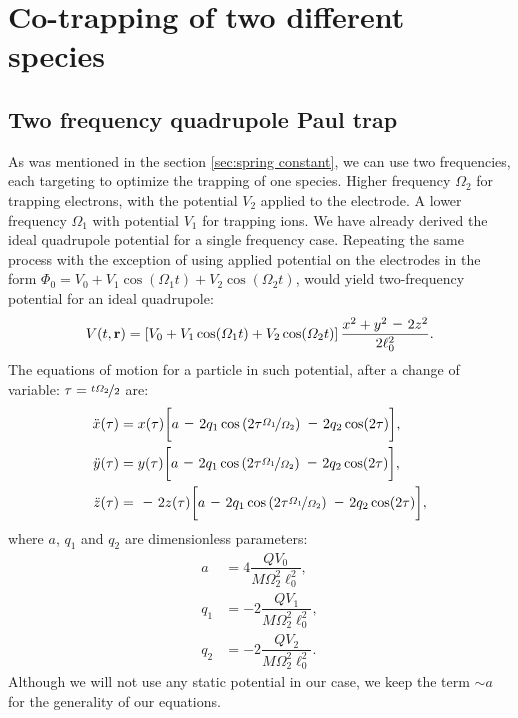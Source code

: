 \chapter{Co-trapping of two different species}
\label{chap:co-trapping}

\section{Two frequency quadrupole Paul trap}
\label{sec:two frequency trap}
As was mentioned in the section \ref{sec:spring constant},
we can use two frequencies, each targeting to optimize the trapping of one species. Higher frequency $\Omega_2$ for trapping electrons, with the potential $V_2$ applied to the electrode. A lower frequency $\Omega_1$ with potential $V_1$ for trapping ions. We have already derived the ideal quadrupole potential for a single frequency case. Repeating the same process with the exception of using applied potential on the electrodes in the form $\Phi_0 = V_0 + V_1 \cos(\Omega_1 t) + V_2 \cos(\Omega_2 t)$, would yield two-frequency potential for an ideal quadrupole:
\begin{equation}
	\label{ideal quadrupole potential two frequency}
	V(t,\vb{r}) = \left[V_0 + V_1 \cos(\Omega_1 t) + V_2 \cos(\Omega_2 t)\right] \dfrac{x^2+y^2 \minus 2z^2}{2\ell_0^2}.
\end{equation}
The equations of motion for a particle in such potential, after a change of variable: $\tau = \nicefrac{t\Omega_2}{2}$ are:
\begin{subequations}
\label{eq of motion for simulation}
\begin{align}
	\ddot{x}(\tau) & = x(\tau) \bigg[ a \minus 2 q_1 \cos\left(2 \tau \nicefrac{\Omega_1}{\Omega_2} \right) \minus 2 q_2 \cos(2\tau) \bigg], \\
	\ddot{y}(\tau) & = y(\tau) \bigg[ a \minus 2 q_1 \cos\left(2 \tau \nicefrac{\Omega_1}{\Omega_2} \right) \minus 2 q_2 \cos(2\tau) \bigg], \\
	\label{studied eq of motion}
	\ddot{z}(\tau) & = \minus 2z(\tau) \bigg[ a \minus 2 q_1 \cos\left(2 \tau \nicefrac{\Omega_1}{\Omega_2} \right) \minus 2 q_2 \cos(2\tau) \bigg],
\end{align}
\end{subequations}
where $a$, $q_1$ and $q_2$ are dimensionless parameters:
\begin{subequations}
\label{Mathieu params}
\begin{align}
	\label{a}
	a & = 4 \dfrac{Q V_0}{M\Omega_2^2 \ell_0^2}, \\
	\label{q_1}
	q_1 & = \minus 2 \dfrac{Q V_1}{M\Omega_2^2 \ell_0^2}, \\
	\label{q_2}
	q_2 & = \minus 2 \dfrac{Q V_2}{M\Omega_2^2 \ell_0^2}.
\end{align}
\end{subequations}
Although we will not use any static potential in our case, we keep the term $\sim a$ for the generality of our equations.

